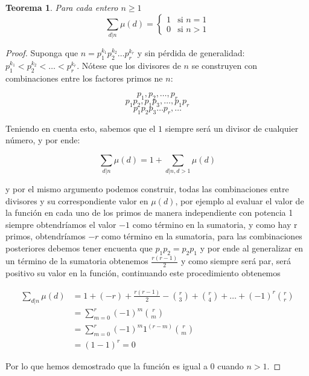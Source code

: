 \documentclass{article}
\newtheorem{theorem}{Teorema}[]
\begin{document}
\begin{theorem}
	Para cada entero $n \geq 1$
	\[
		\sum_{d|n} \mu(d) = 
		\begin{cases} 
			1 & \text{si } n = 1 \\			
			0 & \text{si } n > 1 
		\end{cases}
	\]
\end{theorem}

\begin{proof}
Suponga que $n = p^{k_1}_1 p^{k_2}_2 \dots p^{k_r}_r$ y sin pérdida de generalidad: $p^{k_1}_1 < p^{k_2}_2 < \dots  < p^{k_r}_r$. Nótese que los divisores de $n$ se construyen con combinaciones entre los factores primos ne $n$:
    
$$p_1, p_2, \dots, p_r$$
$$p_1 p_2, p_1 p_3, \dots, p_1 p_r $$
$$p_1 p_2 p_3 \dots p_r, \dots $$

Teniendo en cuenta esto, sabemos que el $1$ siempre será un divisor de cualquier número, y por ende:

$$\sum_{d|n} \mu(d) = 1 + \sum_{d|n, d>1} \mu(d)$$

y por el mismo argumento podemos construir, todas las combinaciones entre divisores y su correspondiente valor en $\mu{(d)}$, por ejemplo al evaluar el valor de la función en cada uno de los primos de manera independiente con potencia 1 siempre obtendríamos el valor $-1$ como término en la sumatoria, y como hay r primos, obtendríamos $-r$ como término en la sumatoria, para las combinaciones posteriores debemos tener encuenta que $p_1 p_2 = p_2 p_1$ y por ende al generalizar en un término de la sumatoria obtenemos $\frac{r(r-1)}{2}$ y como siempre será par, será positivo su valor en la función, continuando este procedimiento obtenemos

\begin{align*}
    \sum_{d|n} \mu(d) &= 1 + (-r) + \frac{r(r-1)}{2} - \binom{r}{3} + \binom{r}{4} + \dots + (-1)^{r} \binom{r}{r}\\
    &= \sum_{m = 0}^{r} (-1)^{m} \binom{r}{m}\\
    &= \sum_{m = 0}^{r} (-1)^{m} 1^{(r-m)} \binom{r}{m} \\
    &= (1-1)^{r} = 0
\end{align*}

Por lo que hemos demostrado que la función es igual a 0 cuando $n>1$.
\end{proof}
\nocite{*}


\end{document}
